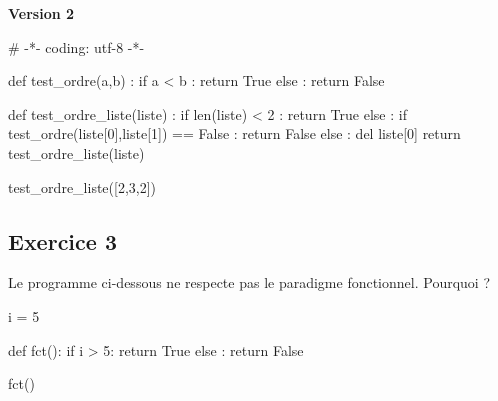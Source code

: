 \documentclass[
  a4paper,
  DIV=11,
  numbers=noendperiod]{scrartcl}
\newenvironment{Shaded}{\begin{snugshade}}{\end{snugshade}}
\newcommand{\BuiltInTok}[1]{\textcolor[rgb]{0.00,0.23,0.31}{#1}}
\newcommand{\CommentTok}[1]{\textcolor[rgb]{0.37,0.37,0.37}{#1}}
\newcommand{\ControlFlowTok}[1]{\textcolor[rgb]{0.00,0.23,0.31}{#1}}
\newcommand{\DecValTok}[1]{\textcolor[rgb]{0.68,0.00,0.00}{#1}}
\newcommand{\KeywordTok}[1]{\textcolor[rgb]{0.00,0.23,0.31}{#1}}
\newcommand{\NormalTok}[1]{\textcolor[rgb]{0.00,0.23,0.31}{#1}}
\newcommand{\OperatorTok}[1]{\textcolor[rgb]{0.37,0.37,0.37}{#1}}
\newcommand{\VariableTok}[1]{\textcolor[rgb]{0.07,0.07,0.07}{#1}}
\begin{document}
\textbf{Version 2}

\begin{Shaded}
\begin{Highlighting}[]
\CommentTok{\# {-}*{-} coding: utf{-}8 {-}*{-}}

\KeywordTok{def}\NormalTok{ test\_ordre(a,b) :}
    \ControlFlowTok{if}\NormalTok{ a }\OperatorTok{\textless{}}\NormalTok{ b :}
        \ControlFlowTok{return} \VariableTok{True}
    \ControlFlowTok{else}\NormalTok{ :}
        \ControlFlowTok{return} \VariableTok{False}

\KeywordTok{def}\NormalTok{ test\_ordre\_liste(liste) :}
    \ControlFlowTok{if} \BuiltInTok{len}\NormalTok{(liste) }\OperatorTok{\textless{}} \DecValTok{2}\NormalTok{ :}
        \ControlFlowTok{return} \VariableTok{True}
    \ControlFlowTok{else}\NormalTok{ :}
        \ControlFlowTok{if}\NormalTok{ test\_ordre(liste[}\DecValTok{0}\NormalTok{],liste[}\DecValTok{1}\NormalTok{]) }\OperatorTok{==} \VariableTok{False}\NormalTok{ :}
            \ControlFlowTok{return} \VariableTok{False}
        \ControlFlowTok{else}\NormalTok{ :}
            \KeywordTok{del}\NormalTok{ liste[}\DecValTok{0}\NormalTok{]}
            \ControlFlowTok{return}\NormalTok{ test\_ordre\_liste(liste)}

\NormalTok{test\_ordre\_liste([}\DecValTok{2}\NormalTok{,}\DecValTok{3}\NormalTok{,}\DecValTok{2}\NormalTok{])}
\end{Highlighting}
\end{Shaded}

\hypertarget{fa-solid-pencil-alt-exercice-3}{%
\subsection{\texorpdfstring{ Exercice
3}{ Exercice 3}}\label{fa-solid-pencil-alt-exercice-3}}

Le programme ci-dessous ne respecte pas le paradigme fonctionnel.
Pourquoi ?

\begin{Shaded}
\begin{Highlighting}[]
\NormalTok{i }\OperatorTok{=} \DecValTok{5}

\KeywordTok{def}\NormalTok{ fct():}
  \ControlFlowTok{if}\NormalTok{ i }\OperatorTok{\textgreater{}} \DecValTok{5}\NormalTok{:}
    \ControlFlowTok{return} \VariableTok{True}
  \ControlFlowTok{else}\NormalTok{ :}
    \ControlFlowTok{return} \VariableTok{False}

\NormalTok{fct()}
\end{Highlighting}
\end{Shaded}
\end{document}
